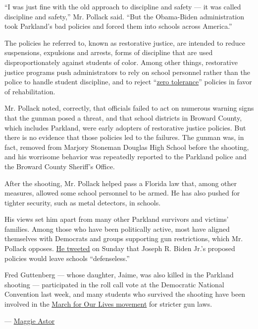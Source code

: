 ``I was just fine with the old approach to discipline and safety --- it
was called discipline and safety,'' Mr. Pollack said. ``But the
Obama-Biden administration took Parkland's bad policies and forced them
into schools across America.''

The policies he referred to, known as restorative justice, are intended
to reduce suspensions, expulsions and arrests, forms of discipline that
are used disproportionately against students of color. Among other
things, restorative justice programs push administrators to rely on
school personnel rather than the police to handle student discipline,
and to reject
``\href{https://www.nytimes3xbfgragh.onion/2016/10/03/us/the-unintended-consequences-of-taking-a-hard-line-on-school-discipline.html}{zero
tolerance}'' policies in favor of rehabilitation.

Mr. Pollack noted, correctly, that officials failed to act on numerous
warning signs that the gunman posed a threat, and that school districts
in Broward County, which includes Parkland, were early adopters of
restorative justice policies. But there is no evidence that those
policies led to the failures. The gunman was, in fact, removed from
Marjory Stoneman Douglas High School before the shooting, and his
worrisome behavior was repeatedly reported to the Parkland police and
the Broward County Sheriff's Office.

After the shooting, Mr. Pollack helped pass a Florida law that, among
other measures, allowed some school personnel to be armed. He has also
pushed for tighter security, such as metal detectors, in schools.

His views set him apart from many other Parkland survivors and victims'
families. Among those who have been politically active, most have
aligned themselves with Democrats and groups supporting gun
restrictions, which Mr. Pollack opposes.
\href{https://twitter.com/AndrewPollackFL/status/1297552296742658050}{He
tweeted} on Sunday that Joseph R. Biden Jr.'s proposed policies would
leave schools ``defenseless.''

Fred Guttenberg --- whose daughter, Jaime, was also killed in the
Parkland shooting --- participated in the roll call vote at the
Democratic National Convention last week, and many students who survived
the shooting have been involved in the
\href{https://www.nytimes3xbfgragh.onion/2018/08/15/us/politics/parkland-students-voting.html}{March
for Our Lives movement} for stricter gun laws.

--- \href{https://www.nytimes3xbfgragh.onion/by/maggie-astor}{Maggie
Astor}


